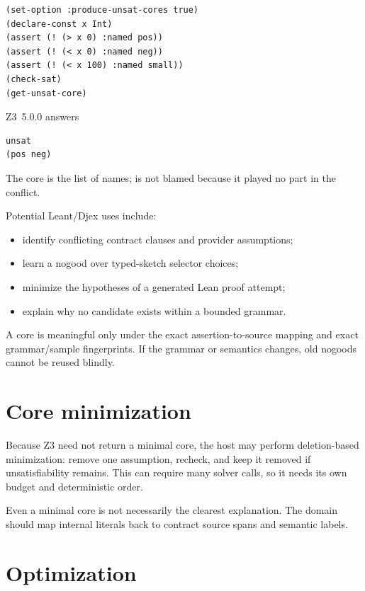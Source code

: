 \documentclass[10pt,letterpaper,oneside]{report}
\newcommand{\code}[1]{\texttt{\detokenize{#1}}}
\begin{document}
\begin{lstlisting}[language=SMTLib,caption={Named assertions and an unsatisfiable core.}]
(set-option :produce-unsat-cores true)
(declare-const x Int)
(assert (! (> x 0) :named pos))
(assert (! (< x 0) :named neg))
(assert (! (< x 100) :named small))
(check-sat)
(get-unsat-core)
\end{lstlisting}

Z3~5.0.0 answers

\begin{lstlisting}[language=SMTLib]
unsat
(pos neg)
\end{lstlisting}

The core is the list of names; \code{small} is not blamed because it played no part in the conflict.


Potential Leant/Djex uses include:

\begin{itemize}
\item identify conflicting contract clauses and provider assumptions;
\item learn a nogood over typed-sketch selector choices;
\item minimize the hypotheses of a generated Lean proof attempt;
\item explain why no candidate exists within a bounded grammar.
\end{itemize}

A core is meaningful only under the exact assertion-to-source mapping and exact grammar/sample fingerprints. If the grammar or semantics changes, old nogoods cannot be reused blindly.

\section{Core minimization}

Because Z3 need not return a minimal core, the host may perform deletion-based minimization: remove one assumption, recheck, and keep it removed if unsatisfiability remains. This can require many solver calls, so it needs its own budget and deterministic order.

Even a minimal core is not necessarily the clearest explanation. The domain should map internal literals back to contract source spans and semantic labels.

\section{Optimization}
\end{document}
